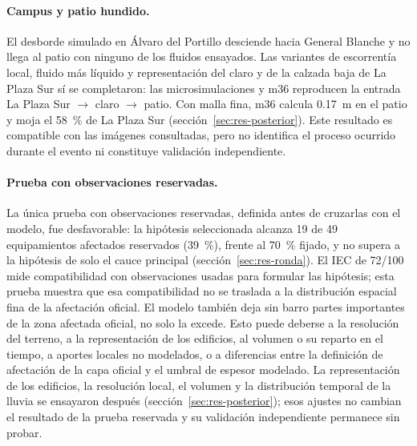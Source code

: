 \paragraph{Campus y patio hundido.} El desborde simulado en Álvaro del Portillo desciende hacia General Blanche y no llega al patio con ninguno de los fluidos ensayados. Las variantes de escorrentía local, fluido más líquido y representación del claro y de la calzada baja de La Plaza Sur sí se completaron: las microsimulaciones y m36 reproducen la entrada La Plaza Sur $\rightarrow$ claro $\rightarrow$ patio. Con malla fina, m36 calcula \SI{0,17}{m} en el patio y moja el \SI{58}{\percent} de La Plaza Sur (sección~\ref{sec:res-posterior}). Este resultado es compatible con las imágenes consultadas, pero no identifica el proceso ocurrido durante el evento ni constituye validación independiente.

\paragraph{Prueba con observaciones reservadas.} La única prueba con observaciones reservadas, definida antes de cruzarlas con el modelo, fue desfavorable: la hipótesis seleccionada alcanza 19 de 49 equipamientos afectados reservados (\SI{39}{\percent}), frente al \SI{70}{\percent} fijado, y no supera a la hipótesis de solo el cauce principal (sección~\ref{sec:res-ronda}). El IEC de 72/100 mide compatibilidad con observaciones usadas para formular las hipótesis; esta prueba muestra que esa compatibilidad no se traslada a la distribución espacial fina de la afectación oficial. El modelo también deja sin barro partes importantes de la zona afectada oficial, no solo la excede. Esto puede deberse a la resolución del terreno, a la representación de los edificios, al volumen o su reparto en el tiempo, a aportes locales no modelados, o a diferencias entre la definición de afectación de la capa oficial y el umbral de espesor modelado. La representación de los edificios, la resolución local, el volumen y la distribución temporal de la lluvia se ensayaron después (sección~\ref{sec:res-posterior}); esos ajustes no cambian el resultado de la prueba reservada y su validación independiente permanece sin probar.

